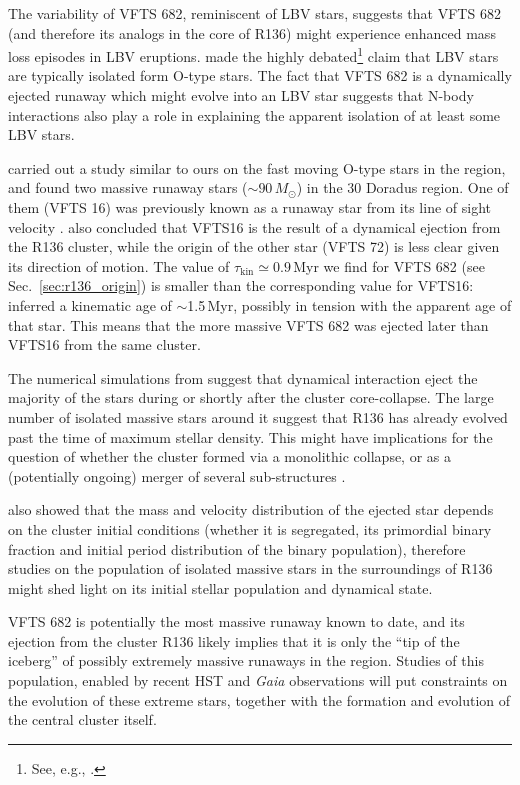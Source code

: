 \documentclass[a4paper,fleqn,usenatbib]{mnras}
\DeclareRobustCommand{\Secref}[1]{Sec.~\ref{#1}}
\begin{document}
The variability of VFTS 682, reminiscent of LBV stars, suggests
that VFTS 682 (and therefore its analogs in the core of R136) might
experience enhanced mass loss episodes in LBV eruptions. \citet{smith:15} made the highly
debated\footnote{See, e.g., \cite{humphreys:16, davidson:16, smith:16}.}
claim that LBV stars are typically isolated form O-type stars. The fact that VFTS 682 is a dynamically
ejected runaway which might evolve into an LBV star suggests that
N-body interactions also play a role in explaining the apparent
isolation of at least some LBV stars. 

\citet{lennon:18} carried out a study similar to ours on the fast
moving O-type stars
in the region, and found two massive runaway stars
($\sim$$90\,M_\odot$) in the 30 Doradus region. One of them (VFTS 16)
was previously known as a runaway star from its line of sight velocity
\citep[][]{evans:10}. \citet{lennon:18} also concluded that VFTS16 is 
the result of a dynamical ejection from the R136 cluster, while the
origin of the other star (VFTS 72) is less clear given its direction
of motion. The value of $\tau_\mathrm{kin}\simeq0.9$\,Myr we find for
VFTS 682 (see \Secref{sec:r136_origin}) is smaller than the
corresponding value for VFTS16: \cite{lennon:18} inferred a kinematic
age of $\sim$1.5\,Myr, possibly in tension with the apparent age of that star. This means that the more
massive VFTS 682 was ejected later than VFTS16 from the same cluster.

The numerical simulations from \cite{oh:16} suggest that dynamical
interaction eject the majority of the stars during or shortly after the cluster
core-collapse. The large number of isolated massive stars around it
suggest that R136 has already evolved past the
time of maximum stellar density. This might have implications for the
question of whether the cluster formed via a monolithic collapse, or
as a (potentially ongoing) merger of several sub-structures \citep[e.g.,]{sabbi:12}.

\citet{oh:16} also showed that the mass and velocity distribution of the ejected star depends on the cluster initial conditions
(whether it is segregated, its primordial binary fraction and initial period
distribution of the binary population), therefore studies on
the population of isolated massive stars in the surroundings of R136
might shed light on its initial stellar population and dynamical
state. 

VFTS 682 is potentially the most massive runaway known to date, and its ejection
from the cluster R136 likely implies that it is only the ``tip of the
iceberg'' of possibly extremely massive runaways in the
region. Studies of this population, enabled by recent HST and \emph{Gaia} observations will put constraints on the evolution
of these extreme stars, together with the formation and evolution of
the central cluster itself.
\end{document}
